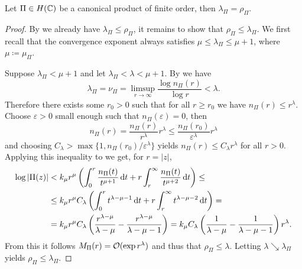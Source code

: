\begin{theorem} \label{thm:exponent-of-convergence-weierstrass-product}
    Let $\Pi \in H(\mathbb{C})$ be a canonical product of finite order, then $\lambda_\Pi = \rho_\Pi$.
\end{theorem}

\begin{proof}
    By  we already have $\lambda_\Pi \leq \rho_\Pi$, it remains to show that $\rho_\Pi \leq \lambda_\Pi$. We first recall that the convergence exponent always satisfies $\mu \leq \lambda_\Pi \leq \mu + 1$, where $\mu \coloneqq \mu_\Pi$.
    
    Suppose $\lambda_\Pi < \mu + 1$ and let $\lambda_\Pi < \lambda < \mu + 1$. By  we have
    $$ \lambda_\Pi = \nu_\Pi = \limsup_{r \to \infty} \frac{\log n_\Pi(r)}{\log r} < \lambda. $$
    Therefore there exists some $r_0 > 0$ such that for all $r \geq r_0$ we have $n_\Pi(r) \leq r^\lambda$. Choose $\varepsilon > 0$ small enough such that $n_\Pi(\varepsilon) = 0$, then
    \begin{equation*}
        n_\Pi(r) = \frac{n_\Pi(r)}{r^\lambda} r^\lambda \leq \frac{n_\Pi(r_0)}{\varepsilon^\lambda} r^\lambda
    \end{equation*}
    and choosing $C_\lambda > \max \{ 1, n_\Pi(r_0) / \varepsilon^\lambda \}$ yields $n_\Pi(r) \leq C_\lambda r^\lambda$ for all $r > 0$. Applying this inequality to  we get, for $r = \vert z \vert$,
    \begin{align*}
        \log \vert \Pi(z) \vert &< k_\mu r^\mu \left( \int_0^r \frac{n_\Pi(t)}{t^{\mu + 1}} \mathop{}\!\mathrm{d} t + r \int_r^\infty \frac{n_\Pi(t)}{t^{\mu + 2}} \mathop{}\!\mathrm{d} t \right) \leq \\
        &\leq k_\mu r^\mu C_\lambda \left( \int_0^r t^{\lambda - \mu - 1} \mathop{}\!\mathrm{d} t + r \int_r^\infty t^{\lambda - \mu - 2} \mathop{}\!\mathrm{d} t \right) = \\
        &= k_\mu r^\mu C_\lambda \left( \frac{r^{\lambda - \mu}}{\lambda - \mu} - \frac{r^{\lambda - \mu}}{\lambda - \mu - 1} \right) = k_\mu C_\lambda \left( \frac{1}{\lambda - \mu} - \frac{1}{\lambda - \mu - 1} \right) r^\lambda.
    \end{align*}
    From this it follows $M_\Pi(r) = \mathcal{O}(\exp r^\lambda)$ and thus that $\rho_\Pi \leq \lambda$. Letting $\lambda \searrow \lambda_\Pi$ yields $\rho_\Pi \leq \lambda_\Pi$.


\end{proof}

